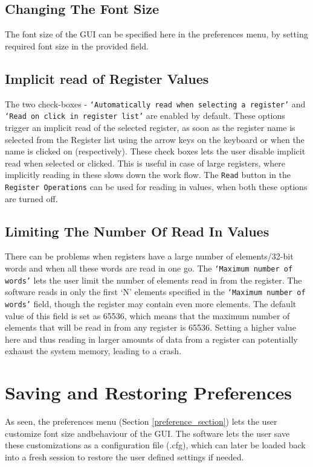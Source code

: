 \subsection{Changing The Font Size} 
The font size of the GUI can be specified here in the preferences menu, 
by setting required font size in the provided field.

\subsection{Implicit read of Register Values}\label{sub::imp_read} 
The two check-boxes - \texttt{`Automatically read when selecting a register'} 
and \texttt{`Read on click in register list'} are enabled by default. 
These options trigger an implicit read of the selected register, as 
soon as the register name is selected from the Register list using the arrow 
keys on the keyboard or when the name is clicked on (respectively). These 
check boxes lets the user disable implicit read when selected or clicked. 
This is useful in case of large registers, where implicitly reading in 
these slows down the work flow. The \texttt{Read} button in the 
\texttt{Register Operations} can be used for reading in values, when 
both these options are turned off.

\subsection{Limiting The Number Of Read In Values}\label{subsub::graph_x_axis}
There can be problems when registers have a large number of elements/32-bit
words and when all these words are read in one go. The \texttt{`Maximum number
of words'} lets the user limit the number of elements read in from the register.
The software reads in only the first `N' elements specified in the
\texttt{`Maximum number of words'} field, though the register may contain even
more elements. The default value of this field is set as 65536, which means that
the maximum number of elements that will be read in from any register is 65536.
Setting a higher value here and thus reading in larger amounts of data from a
register can potentially exhaust the system memory, leading to a crash.
		
\section{Saving and Restoring Preferences} 
As seen, the preferences menu (Section \ref{preference_section}) 
lets the user customize font size andbehaviour of the GUI. The software 
lets the user save these customizations as a
configuration file (.cfg), which can later be loaded back into a fresh session
to restore the user defined settings if needed.


